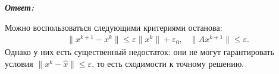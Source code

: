 \documentclass[12pt, a4paper]{article}
\newcommand{\norm}[1]{\lVert #1 \rVert}
\begin{document}
\begin{enumerate}
		\vspace*{0.2cm}
		\textit{\textbf{Ответ:}}

Можно воспользоваться следующими критериями останова:
\begin{equation*}
\begin{aligned}
&\norm{x^{k+1} - x^k} \leq \varepsilon \norm{x^k} + {\varepsilon }_0, 
&\norm{A x^{k + 1}} \leq \varepsilon .
\end{aligned}
\end{equation*}
Однако у них есть существенный недостаток: они не могут гарантировать условия $\norm{x^k - \hat{x}} \leq \varepsilon$, то есть сходимости к точному решению.
		
	\end{enumerate}
\end{document}
